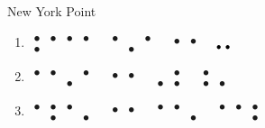 \begin{refsection}
\begin{problem}{New York Point}{\namePLittell}{}
\begin{multicols}{2}
\begin{enumerate}
\item {\Large \boldmath$\begin{smallmatrix} 
    \bullet & \bullet & \bullet & \bullet \\ \bullet & &  &
\end{smallmatrix}$\ \ $\begin{smallmatrix}
  \bullet & & \bullet \\  & \bullet &
\end{smallmatrix}$\ \ $\begin{smallmatrix}
  \bullet & \bullet \\  & 
\end{smallmatrix}$\ \ $\begin{smallmatrix}
  & \vphantom{\bullet} \\ \bullet& \bullet
\end{smallmatrix}$}
    
\item {\Large \boldmath$\begin{smallmatrix} 
    \bullet & \bullet &  & \bullet \\  & & \bullet &
\end{smallmatrix}$\ \ $\begin{smallmatrix}
  \bullet & \bullet \\  & 
\end{smallmatrix}$\ \ $\begin{smallmatrix}
  & \bullet \\ \bullet & \bullet
\end{smallmatrix}$\ \ $\begin{smallmatrix}
  \bullet &  \\ \bullet& \bullet
\end{smallmatrix}$}

\item {\Large \boldmath$\begin{smallmatrix} 
    \bullet & \bullet & \bullet &  \\  &\bullet &  &\bullet
\end{smallmatrix}$\ \ $\begin{smallmatrix}
  \bullet & \bullet \\  & 
\end{smallmatrix}$\ \ $\begin{smallmatrix}
  \bullet & \bullet & \\  & & \bullet
\end{smallmatrix}$\ \ $\begin{smallmatrix}
  \bullet & \bullet & \bullet \\ & & \bullet
\end{smallmatrix}$}


\end{enumerate}
\end{multicols}
\end{problem}
\end{refsection}
